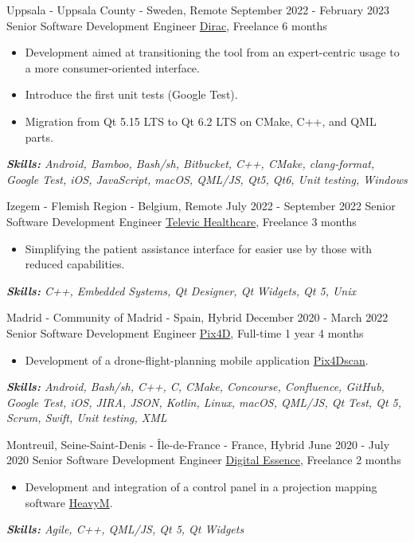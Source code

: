 \documentclass[11pt,a4paper,roman]{moderncv}
\begin{document}
\cventry
{Uppsala - Uppsala County - Sweden, Remote}
{September 2022 - February 2023}
{Senior Software Development Engineer}
{\href{https://www.dirac.com}{Dirac}, Freelance}
{6 months}
{}
{
\begin{itemize}
	\item Development aimed at transitioning the tool from an expert-centric usage to a more consumer-oriented interface.
	\item Introduce the first unit tests (Google Test).
	\item Migration from Qt 5.15 LTS to Qt 6.2 LTS on CMake, C++, and QML parts.
\end{itemize}

{\textcolor{color2}{\textit{\textbf{Skills:}
	Android,
	Bamboo,
	Bash/sh,
	Bitbucket,
	C++,
	CMake,
	clang-format,
	Google Test,
	iOS,
	JavaScript,
	macOS,
	QML/JS,
   Qt5,
	Qt6,
	Unit testing,
	Windows
	\newline
}}}}


\cventry
{Izegem - Flemish Region - Belgium, Remote}
{July 2022 - September 2022}
{Senior Software Development Engineer}
{\href{https://www.televic.com/en/healthcare}{Televic Healthcare}, Freelance}
{3 months}
{}
{
\begin{itemize}
	\item Simplifying the patient assistance interface for easier use by those with reduced capabilities.
\end{itemize}
{\textcolor{color2}{\textit{\textbf{Skills:}
	C++,
	Embedded Systems,
	Qt Designer,
	Qt Widgets,
	Qt 5,
	Unix
	\newline
}}}}


\cventry
{Madrid - Community of Madrid - Spain, Hybrid}
{December 2020 - March 2022}
{Senior Software Development Engineer}
{\href{https://www.pix4d.com}{Pix4D}, Full-time}
{1 year 4 months}
{}
{
\begin{itemize}
	\item Development of a drone-flight-planning mobile application \href{https://www.pix4d.com/es/producto/pix4dscan}{Pix4Dscan}.
\end{itemize}
{\textcolor{color2}{\textit{\textbf{Skills:}
	Android,
	Bash/sh,
	C++,
	C,
	CMake,
	Concourse,
	Confluence,
	GitHub,
	Google Test,
	iOS,
	JIRA,
	JSON,
	Kotlin,
	Linux,
	macOS,
	QML/JS,
	Qt Test,
	Qt 5,
	Scrum,
	Swift,
	Unit testing,
	XML
	\newline
}}}}


\cventry
{Montreuil, Seine-Saint-Denis - Île-de-France - France, Hybrid}
{June 2020 - July 2020}
{Senior Software Development Engineer}
{\href{https://digitalessence.fr/en/}{Digital Essence}, Freelance}
{2 months}
{}
{
\begin{itemize}
\item Development and integration of a control panel in a projection mapping software \href{https://www.heavym.net}{HeavyM}.
\end{itemize}
{\textcolor{color2}{\textit{\textbf{Skills:}
	Agile,
	C++,
	QML/JS,
	Qt 5,
	Qt Widgets
	\newline
}}}}
\end{document}
